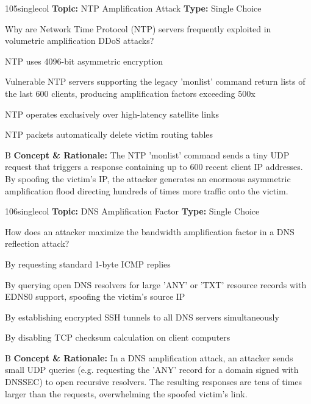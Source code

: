 \begin{qcard}{105}{singlecol}
\textcolor{darkslate!75}{\small\textbf{Topic:} NTP Amplification Attack \hfill \textbf{Type:} Single Choice}\vspace{0.4em}\par
Why are Network Time Protocol (NTP) servers frequently exploited in volumetric amplification DDoS attacks?
\begin{qoptions}
\item NTP uses 4096-bit asymmetric encryption
\item Vulnerable NTP servers supporting the legacy 'monlist' command return lists of the last 600 clients, producing amplification factors exceeding 500x
\item NTP operates exclusively over high-latency satellite links
\item NTP packets automatically delete victim routing tables
\end{qoptions}
\end{qcard}
\nopagebreak
\begin{explainbox}{B}
\textbf{Concept \& Rationale:} The NTP 'monlist' command sends a tiny UDP request that triggers a response containing up to 600 recent client IP addresses. By spoofing the victim's IP, the attacker generates an enormous asymmetric amplification flood directing hundreds of times more traffic onto the victim.
\end{explainbox}

\begin{qcard}{106}{singlecol}
\textcolor{darkslate!75}{\small\textbf{Topic:} DNS Amplification Factor \hfill \textbf{Type:} Single Choice}\vspace{0.4em}\par
How does an attacker maximize the bandwidth amplification factor in a DNS reflection attack?
\begin{qoptions}
\item By requesting standard 1-byte ICMP replies
\item By querying open DNS resolvers for large 'ANY' or 'TXT' resource records with EDNS0 support, spoofing the victim's source IP
\item By establishing encrypted SSH tunnels to all DNS servers simultaneously
\item By disabling TCP checksum calculation on client computers
\end{qoptions}
\end{qcard}
\nopagebreak
\begin{explainbox}{B}
\textbf{Concept \& Rationale:} In a DNS amplification attack, an attacker sends small UDP queries (e.g. requesting the 'ANY' record for a domain signed with DNSSEC) to open recursive resolvers. The resulting responses are tens of times larger than the requests, overwhelming the spoofed victim's link.
\end{explainbox}

